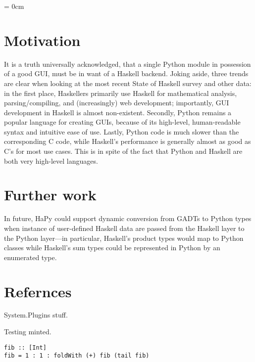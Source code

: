 \documentclass[11pt, letterpaper, oneside] {article}
\begin{document}
\parindent = 0cm

\section{Motivation}
It is a truth universally acknowledged, that a single Python module in possession of a good GUI, must be in want of a Haskell backend. Joking aside, three trends are clear when looking at the most recent State of Haskell survey and other data: in the first place, Haskellers primarily use Haskell for mathematical analysis, parsing/compiling, and (increasingly) web development; importantly, GUI development in Haskell is almost non-existent. Secondly, Python remains a popular language for creating GUIs, because of its high-level, human-readable syntax and intuitive ease of use. Lastly, Python code is much slower than the corresponding C code, while Haskell's performance is generally almost as good as C's for most use cases. This is in spite of the fact that Python and Haskell are both very high-level languages. 

\section{Further work}
In future, HaPy could support dynamic conversion from GADTs to Python types when instance of user-defined Haskell data are passed from the Haskell layer to the Python layer---in particular, Haskell's product types would map to Python classes while Haskell's sum types could be represented in Python by an enumerated type. 
\section{Refernces}
System.Plugins stuff.

Testing minted.
\begin{verbatim}
fib :: [Int]
fib = 1 : 1 : foldWith (+) fib (tail fib)
\end{verbatim}
\end{document}
